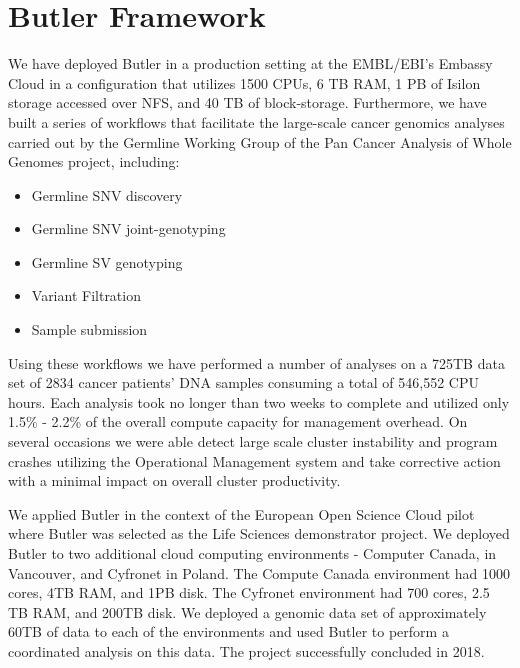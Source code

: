 \section{Butler Framework}

We have deployed Butler in a production setting at the EMBL/EBI's Embassy Cloud in a configuration that utilizes 1500 CPUs, 6 TB RAM, 1 PB of Isilon storage accessed over NFS, and 40 TB of block-storage. Furthermore, we have built a series of workflows that facilitate the large-scale cancer genomics analyses carried out by the Germline Working Group of the Pan Cancer Analysis of Whole Genomes project, including:

\begin{itemize}
\item Germline SNV discovery
\item Germline SNV joint-genotyping
\item Germline SV genotyping
\item Variant Filtration
\item Sample submission
\end{itemize}

Using these workflows we have performed a number of analyses on a 725TB data set of 2834 cancer patients' DNA samples consuming a total of 546,552 CPU hours. Each analysis took no longer than two weeks to complete and utilized only 1.5\% - 2.2\% of the overall compute capacity for management overhead. On several occasions we were able detect large scale cluster instability and program crashes utilizing the Operational Management system and take corrective action with a minimal impact on overall cluster productivity.

We applied Butler in the context of the European Open Science Cloud pilot where Butler was selected as the Life Sciences demonstrator project. We deployed Butler to two additional cloud computing environments - Computer Canada, in Vancouver, and Cyfronet in Poland. The Compute Canada environment had 1000 cores, 4TB RAM, and 1PB disk. The Cyfronet environment had 700 cores, 2.5 TB RAM, and 200TB disk. We deployed a genomic data set of approximately 60TB of data to each of the environments and used Butler to perform a coordinated analysis on this data. The project successfully concluded in 2018.

